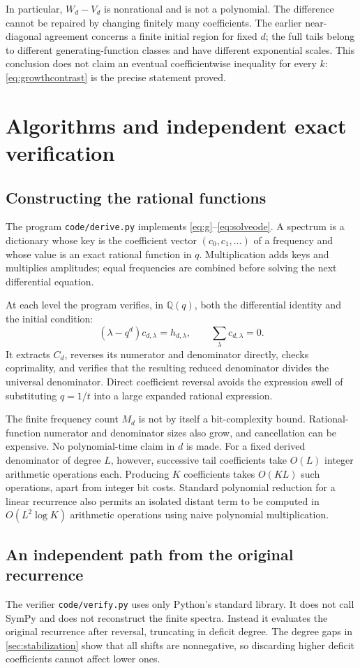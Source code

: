 \documentclass[11pt,letterpaper]{article}
\numberwithin{equation}{section}
\theoremstyle{definition}
\theoremstyle{remark}
\newcommand{\Q}{\mathbb Q}
\begin{document}
In particular, $W_d-V_d$ is nonrational and is not a polynomial.
The difference cannot be repaired by changing finitely many coefficients.
The earlier near-diagonal agreement concerns a finite initial region
for fixed $d$; the full tails belong to different generating-function
classes and have different exponential scales.
This conclusion does not claim an eventual coefficientwise inequality
for every $k$: \eqref{eq:growthcontrast} is the precise statement proved.

\section{Algorithms and independent exact verification}\label{sec:computation}
\subsection{Constructing the rational functions}
The program \texttt{code/derive.py} implements
\eqref{eq:g}--\eqref{eq:solveode}. A spectrum is a dictionary whose key is
the coefficient vector $(c_0,c_1,\ldots)$ of a frequency and whose value
is an exact rational function in $q$. Multiplication adds keys and
multiplies amplitudes; equal frequencies are combined before solving
the next differential equation.

At each level the program verifies, in $\Q(q)$, both the differential
identity and the initial condition:
\[
 (\lambda-q^d)c_{d,\lambda}=h_{d,\lambda},\qquad
 \sum_\lambda c_{d,\lambda}=0.
\]
It extracts $C_d$, reverses its numerator and denominator directly,
checks coprimality, and verifies that the resulting reduced denominator
divides the universal denominator. Direct coefficient reversal avoids
the expression swell of substituting $q=1/t$ into a large expanded
rational expression.

The finite frequency count $M_d$ is not by itself a bit-complexity bound.
Rational-function numerator and denominator sizes also grow, and
cancellation can be expensive. No polynomial-time claim in $d$ is made.
For a fixed derived denominator of degree $L$, however, successive tail
coefficients take $O(L)$ integer arithmetic operations each. Producing
$K$ coefficients takes $O(KL)$ such operations, apart from integer bit
costs. Standard polynomial reduction for a linear recurrence also permits
an isolated distant term to be computed in $O(L^2\log K)$ arithmetic
operations using naive polynomial multiplication.

\subsection{An independent path from the original recurrence}
The verifier \texttt{code/verify.py} uses only Python's standard library.
It does not call SymPy and does not reconstruct the finite spectra.
Instead it evaluates the original recurrence after reversal, truncating
in deficit degree. The degree gaps in \cref{sec:stabilization} show that
all shifts are nonnegative, so discarding higher deficit coefficients
cannot affect lower ones.
\end{document}
